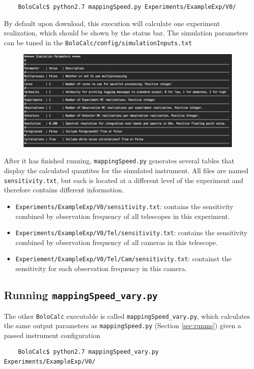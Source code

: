\documentclass[11pt]{article} %
\begin{document}
\begin{lstlisting}
	BoloCalc$ python2.7 mappingSpeed.py Experiments/ExampleExp/V0/	
\end{lstlisting}
By default upon download, this execution will calculate one experiment realization, which should be shown by the status bar. The simulation parameters can be tuned in the \texttt{BoloCalc/config/simulationInputs.txt}
\begin{figure}[h!]
	\centering
	\includegraphics[width=1.0\textwidth]{SimulationInputs_Example}
\end{figure}
After it has finished running, \texttt{mappingSpeed.py} generates several tables that display the calculated quantites for the simulated instrument. All files are named \texttt{sensitivity.txt}, but each is located at a different level of the experiment and therefore contains different information.
\begin{itemize}[noitemsep,topsep=0pt]
	\item \texttt{Experiments/ExampleExp/V0/sensitivity.txt}: contains the sensitivity combined by observation frequency of all telescopes in this experiment.
	\item \texttt{Experiments/ExampleExp/V0/Tel/sensitivity.txt}: contains the sensitivity combined by observation frequency of all cameras in this telescope.
	\item \texttt{Experiement/ExampleExp/V0/Tel/Cam/sensitivity.txt}: containst the sensitivity for each observation frequency in this camera.
\end{itemize}
\subsection{Running \texttt{mappingSpeed\_vary.py}}
\label{sec:runmsv}
The other \texttt{BoloCalc} executable is called \texttt{mappingSpeed\_vary.py}, which calculates the same output parameters as \texttt{mappingSpeed.py} (Section \ref{sec:runms}) given a passed instrument configuration
\begin{lstlisting}
	BoloCalc$ python2.7 mappingSpeed_vary.py Experiments/ExampleExp/V0/	
\end{lstlisting}
\end{document}
